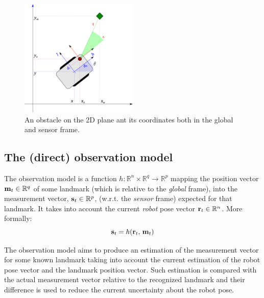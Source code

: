 		\begin{figure}
			\centering
			\includegraphics[width=0.5\textwidth]{./img/observation.pdf}
			\caption{An obstacle on the 2D plane ant its coordinates both in the global and sensor frame.}
			\label{fig.observation}
		\end{figure}
		
\subsection{The (direct) observation model}
	The observation model is a function $h : \mathbb{R}^n \times \mathbb{R}^q \rightarrow \mathbb{R}^p$ mapping the position vector $\boldsymbol{\mathrm{{m}}}_t \in \mathbb{R}^q$ of some landmark (which is relative to the \emph{global} frame), into the measurement vector, $\boldsymbol{\mathrm{{s}}}_{t} \in \mathbb{R}^p$, (w.r.t. the \emph{sensor} frame) expected for that landmark. 
	It takes into account the current \emph{robot} pose vector $\boldsymbol{\mathrm{{r}}}_t \in \mathbb{R}^n$.
	More formally:
	\[
		\boldsymbol{\mathrm{{s}}}_t = h(\boldsymbol{\mathrm{{r}}}_{t},\, \boldsymbol{\mathrm{{m}}}_t)
	\]
	
	The observation model aims to produce an estimation of the measurement vector for some known landmark taking into account the current estimation of the robot pose vector and the landmark position vector. 
	Such estimation is compared with the actual measurement vector relative to the recognized landmark and their difference is used to reduce the current uncertainty about the robot pose. 
	
